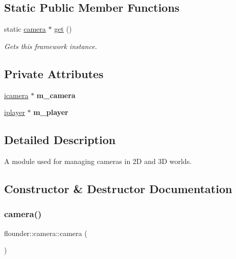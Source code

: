 \subsection*{Static Public Member Functions}
\begin{DoxyCompactItemize}
\item 
static \hyperlink{classflounder_1_1camera}{camera} $\ast$ \hyperlink{classflounder_1_1camera_a3ea117d355e4925fa5238bae5e6e46b1}{get} ()
\begin{DoxyCompactList}\small\item\em Gets this framework instance. \end{DoxyCompactList}\end{DoxyCompactItemize}
\subsection*{Private Attributes}
\begin{DoxyCompactItemize}
\item 
\mbox{\label{classflounder_1_1camera_a0fdfccdc761a7c057c431e2e1b1e9456}} 
\hyperlink{classflounder_1_1icamera}{icamera} $\ast$ {\bfseries m\+\_\+camera}
\item 
\mbox{\label{classflounder_1_1camera_a8dc046728d790d77234a25dca96ac649}} 
\hyperlink{classflounder_1_1iplayer}{iplayer} $\ast$ {\bfseries m\+\_\+player}
\end{DoxyCompactItemize}


\subsection{Detailed Description}
A module used for managing cameras in 2D and 3D worlds. 



\subsection{Constructor \& Destructor Documentation}
\mbox{\label{classflounder_1_1camera_a84e93f21953c21facbcddf77d83c7c47}} 
\subsubsection{\texorpdfstring{camera()}{camera()}}
{\footnotesize\ttfamily flounder\+::camera\+::camera (\begin{DoxyParamCaption}{ }\end{DoxyParamCaption})}



